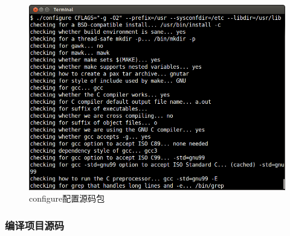 \documentclass[11pt,a4paper]{article}
\makeatletter
\def\maxwidth{\ifdim\Gin@nat@width>\linewidth\linewidth
\else\Gin@nat@width\fi}
\let\Oldincludegraphics\includegraphics
\renewcommand{\includegraphics}[1]{\Oldincludegraphics[width=\maxwidth]{#1}}
\makeatother
\begin{document}
\begin{figure}[htbp]
\centering
\includegraphics{./pictures/1-3-configure.png}
\caption{configure配置源码包}
\end{figure}

\subsubsection{编译项目源码}
\end{document}
